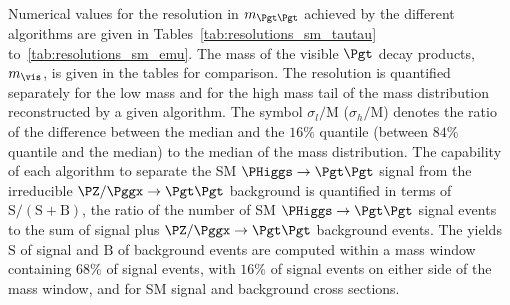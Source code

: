 Numerical values for the resolution in $m_{\Pgt\Pgt}$ achieved by the different algorithms are given in Tables~\ref{tab:resolutions_sm_tautau} to~\ref{tab:resolutions_sm_emu}.
The mass of the visible $\Pgt$ decay products, $m_{\vis}$, is given in the tables for comparison.
The resolution is quantified separately for the low mass and for the high mass tail of the mass distribution reconstructed by a given algorithm.
The symbol $\sigma_{l}/\textrm{M}$ ($\sigma_{h}/\textrm{M}$) denotes the 
ratio of the difference between the median and the $16\%$ quantile (between $84\%$ quantile and the median) to the median
of the mass distribution.
The capability of each algorithm to separate the SM $\PHiggs \to \Pgt\Pgt$ signal from the irreducible $\PZ/\Pggx \to \Pgt\Pgt$ background 
is quantified in terms of $\textrm{S}/(\textrm{S} + \textrm{B})$, the ratio of the number of SM $\PHiggs \to \Pgt\Pgt$ signal events to the sum of signal plus $\PZ/\Pggx \to \Pgt\Pgt$ background events.
The yields $\textrm{S}$ of signal and $\textrm{B}$ of background events are computed within a mass window containing $68\%$ of signal events,
with $16\%$ of signal events on either side of the mass window, and for SM signal and background cross sections.

